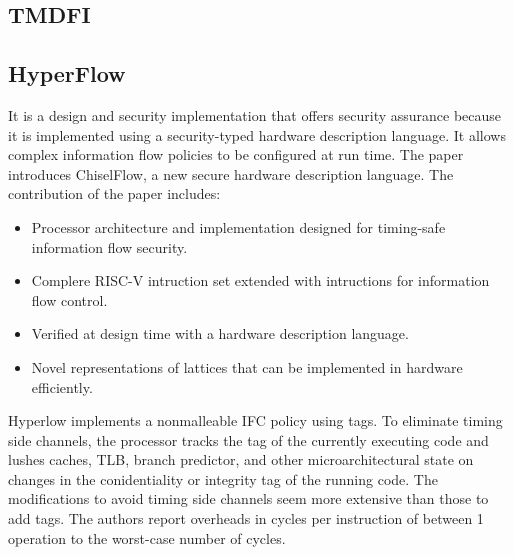 \subsection{TMDFI}


\subsection{HyperFlow} 
It is a design and security implementation that offers security assurance because it is implemented 
using a security-typed hardware description language. It allows complex information flow policies to 
be configured at run time. The paper introduces ChiselFlow, a new secure hardware description language. 
The contribution of the paper includes: 
\begin{itemize}
  \item Processor architecture and implementation designed for timing-safe information flow security. 
  \item Complere RISC-V intruction set extended with intructions for information flow control. 
  \item Verified at design time with a hardware description language. 
  \item Novel representations of lattices that can be implemented in hardware efficiently. 
\end{itemize}
Hyperlow implements a nonmalleable IFC policy using tags.
To eliminate timing side channels, the processor tracks the tag of the currently executing code and lushes caches,
TLB, branch predictor, and other microarchitectural state on changes in the conidentiality or integrity tag of the
running code. The modifications to avoid timing side channels seem more extensive than those to add tags. The
authors report overheads in cycles per instruction of between 1%
operation to the worst-case number of cycles.

